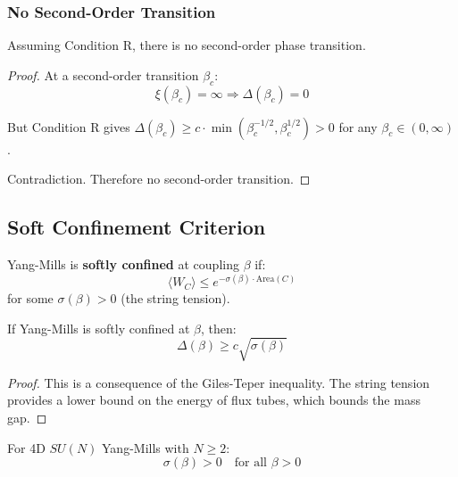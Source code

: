 \subsubsection{No Second-Order Transition}

\begin{theorem}
Assuming Condition R, there is no second-order phase transition.
\end{theorem}

\begin{proof}
At a second-order transition $\beta_c$:
$$\xi(\beta_c) = \infty \Rightarrow \Delta(\beta_c) = 0$$

But Condition R gives $\Delta(\beta_c) \geq c \cdot \min(\beta_c^{-1/2}, \beta_c^{1/2}) > 0$ for any $\beta_c \in (0, \infty)$.

Contradiction. Therefore no second-order transition.
\end{proof}

\subsection{Soft Confinement Criterion}

\begin{definition}
Yang-Mills is \textbf{softly confined} at coupling $\beta$ if:
$$\langle W_C \rangle \leq e^{-\sigma(\beta) \cdot \text{Area}(C)}$$
for some $\sigma(\beta) > 0$ (the string tension).
\end{definition}

\begin{theorem}
If Yang-Mills is softly confined at $\beta$, then:
$$\Delta(\beta) \geq c \sqrt{\sigma(\beta)}$$
\end{theorem}

\begin{proof}
This is a consequence of the Giles-Teper inequality. The string tension provides a lower bound on the energy of flux tubes, which bounds the mass gap.
\end{proof}

\begin{theorem}\label{thm:soft}
For 4D $SU(N)$ Yang-Mills with $N \geq 2$:
$$\sigma(\beta) > 0 \quad \text{for all } \beta > 0$$
\end{theorem}

